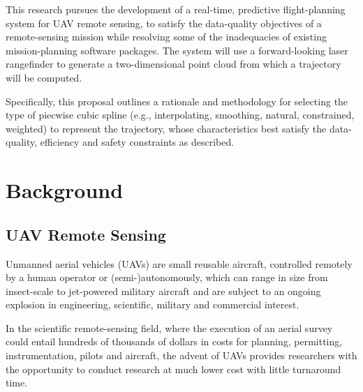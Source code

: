 \documentclass[doc]{apa6}
\begin{document}
This research pursues the development of a real-time, predictive flight-planning system for UAV remote sensing, to satisfy the data-quality objectives of a remote-sensing mission while resolving some of the inadequacies of existing mission-planning software packages. The system will use a forward-looking laser rangefinder to generate a two-dimensional point cloud from which a trajectory will be computed.

Specifically, this proposal outlines a rationale and methodology for selecting the type of piecwise cubic spline (e.g., interpolating, smoothing, natural, constrained, weighted) to represent the trajectory, whose characteristics best satisfy the data-quality, efficiency and safety constraints as described. 



\section{Background}

\subsection{UAV Remote Sensing}

Unmanned aerial vehicles (UAVs) are small reusable aircraft, controlled remotely by a human operator or (semi-)autonomously, which can range in size from insect-scale to jet-powered military aircraft \parencite{Avadhanula2002,Deng2003} and are subject to an ongoing explosion in engineering, scientific, military and commercial interest. 



In the scientific remote-sensing field, where the execution of an aerial survey could entail hundreds of thousands of dollars in costs for planning, permitting, instrumentation, pilots and aircraft, the advent of UAVs provides researchers with the opportunity to conduct research at much lower cost with little turnaround time. 
\end{document}
